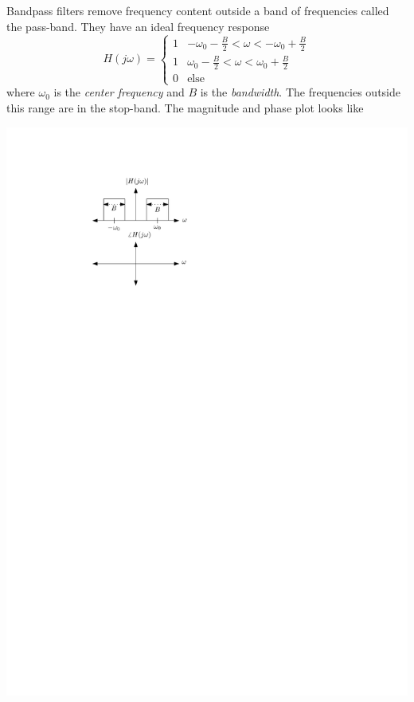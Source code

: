 Bandpass filters remove frequency content outside a band of frequencies called the pass-band. They have an ideal frequency response
\[
H(j\omega) = \left\{ \begin{array}{lc}
  1 & -\omega_0 - \frac{B}{2} < \omega < -\omega_0+\frac{B}{2}\\[1em]
  1 & \omega_0 -\frac{B}{2} < \omega < \omega_0+\frac{B}{2}\\[1em]
  0 & \text{else}
\end{array}
\right. 
\]
where $\omega_0$ is the \emph{center frequency} and $B$ is the \emph{bandwidth}. The frequencies outside this range are in the stop-band. The magnitude and phase plot looks like
\begin{center}
  \includegraphics[scale=1]{graphics/bandpass-ideal.pdf}
\end{center}


